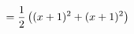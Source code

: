 \documentclass[preview]{standalone}
\begin{document}
\begin{align*}
\special{dvisvgm:raw <g id='unique000'>}=\frac{1}{2}\left((x+1)^2+(x+1)^2\right)\special{dvisvgm:raw </g>}
\end{align*}
\end{document}
